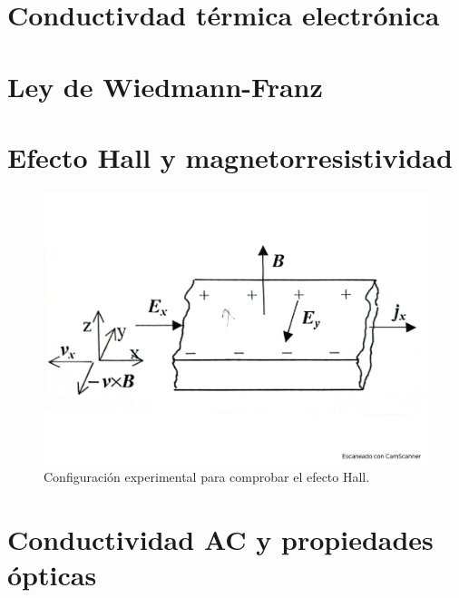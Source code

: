 \section{Conductivdad térmica electrónica}

\section{Ley de Wiedmann-Franz}

\section{Efecto Hall y magnetorresistividad}
\begin{figure}[h!] \centering
    \includegraphics[scale=0.5]{Cuerpo/Ch_06/Fotos libro 7.pdf}
    \caption{Configuración experimental para comprobar el efecto Hall.}
    \label{Fig:06-07}
\end{figure}  


\section{Conductividad AC y propiedades ópticas}
